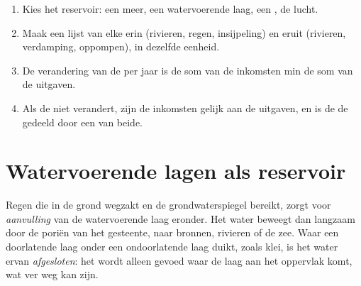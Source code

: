 \begin{method}\label{met:g10:freshwater-resources:budget}
\begin{enumerate}
  \item Kies het reservoir: een meer, een watervoerende laag, een , de lucht.
  \item Maak een lijst van elke  erin (rivieren, regen, insijpeling) en eruit
        (rivieren, verdamping, oppompen), in dezelfde eenheid.
  \item De verandering van de  per jaar is de som van de inkomsten min de
        som van de uitgaven.
  \item Als de  niet verandert, zijn de inkomsten gelijk aan de uitgaven,
        en is de  de  gedeeld door een van beide.
\end{enumerate}
\end{method}

\section{Watervoerende lagen als reservoir}

Regen die in de grond wegzakt en de grondwaterspiegel bereikt, zorgt voor
\emph{aanvulling} van de watervoerende laag eronder. Het water beweegt dan langzaam door de
poriën van het gesteente, naar bronnen, rivieren of de zee. Waar een doorlatende
laag onder een ondoorlatende laag duikt, zoals klei, is het water ervan
\emph{afgesloten}: het wordt alleen gevoed waar de laag aan het oppervlak komt,
wat ver weg kan zijn.

